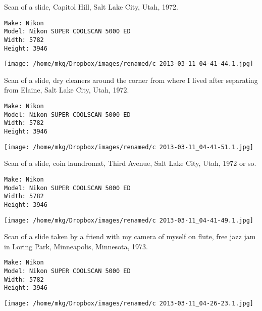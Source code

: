 \clearpage

\noindent Scan of a slide, Capitol Hill, Salt Lake City, Utah, 1972.

\begin{lstlisting}
Make: Nikon
Model: Nikon SUPER COOLSCAN 5000 ED
Width: 5782
Height: 3946

\end{lstlisting}

\clearpage
\texttt{[image: /home/mkg/Dropbox/images/renamed/c 2013-03-11\_04-41-44.1.jpg]}

\clearpage

\noindent Scan of a slide, dry cleaners around the corner from where I lived after separating from Elaine, Salt Lake City, Utah, 1972.

\begin{lstlisting}
Make: Nikon
Model: Nikon SUPER COOLSCAN 5000 ED
Width: 5782
Height: 3946

\end{lstlisting}

\clearpage
\texttt{[image: /home/mkg/Dropbox/images/renamed/c 2013-03-11\_04-41-51.1.jpg]}

\clearpage

\noindent Scan of a slide, coin laundromat, Third Avenue, Salt Lake City, Utah, 1972 or so.

\begin{lstlisting}
Make: Nikon
Model: Nikon SUPER COOLSCAN 5000 ED
Width: 5782
Height: 3946

\end{lstlisting}

\clearpage
\texttt{[image: /home/mkg/Dropbox/images/renamed/c 2013-03-11\_04-41-49.1.jpg]}

\clearpage

\noindent Scan of a slide taken by a friend with my camera of myself on flute, free jazz jam in Loring Park, Minneapolis, Minnesota, 1973.

\begin{lstlisting}
Make: Nikon
Model: Nikon SUPER COOLSCAN 5000 ED
Width: 5782
Height: 3946

\end{lstlisting}

\clearpage
\texttt{[image: /home/mkg/Dropbox/images/renamed/c 2013-03-11\_04-26-23.1.jpg]}

